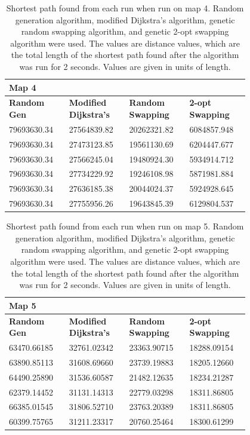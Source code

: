 \documentclass{article}
\begin{document}
\begin{appendices}
\begin{table}[H]
    \caption{Shortest path found from each run when run on map 4. Random generation algorithm, modified Dijkstra's algorithm, genetic random swapping algorithm, and genetic 2-opt swapping algorithm were used. The values are distance values, which are the total length of the shortest path found after the algorithm was run for 2 seconds. Values are given in units of length.} \label{Table map 4}
    \centering
    \begin{tabular}{|p{0.2\linewidth}|p{0.2\linewidth}|p{0.2\linewidth}|p{0.2\linewidth}|}
    \hline
        \textbf{Map 4} & ~ & ~ & ~ \\ \hline
        \textbf{Random Gen} & \textbf{Modified Dijkstra's} & \textbf{Random Swapping} & \textbf{2-opt Swapping} \\ \hline
        79693630.34 & 27564839.82 & 20262321.82 & 6084857.948 \\ \hline
        79693630.34 & 27473123.85 & 19561130.69 & 6204447.677 \\ \hline
        79693630.34 & 27566245.04 & 19480924.30 & 5934914.712 \\ \hline
        79693630.34 & 27734229.92 & 19246108.98 & 5871981.884 \\ \hline
        79693630.34 & 27636185.38 & 20044024.37 & 5924928.645 \\ \hline
        79693630.34 & 27755956.26 & 19643845.39 & 6129804.537 \\ \hline
    \end{tabular}
\end{table}

\begin{table}[H]
    \caption{Shortest path found from each run when run on map 5. Random generation algorithm, modified Dijkstra's algorithm, genetic random swapping algorithm, and genetic 2-opt swapping algorithm were used. The values are distance values, which are the total length of the shortest path found after the algorithm was run for 2 seconds. Values are given in units of length.}
    \centering
    \begin{tabular}{|p{0.2\linewidth}|p{0.2\linewidth}|p{0.2\linewidth}|p{0.2\linewidth}|}
    \hline
        \textbf{Map 5} & ~ & ~ & ~ \\ \hline
        \textbf{Random Gen} & \textbf{Modified Dijkstra's} & \textbf{Random Swapping} & \textbf{2-opt Swapping} \\ \hline
        63470.66185 & 32761.02342 & 23363.90715 & 18288.09154 \\ \hline
        63890.85113 & 31608.69660 & 23739.19883 & 18205.12660 \\ \hline
        64490.25890 & 31536.60587 & 21482.12635 & 18234.21287 \\ \hline
        62379.14452 & 31131.14313 & 22779.03298 & 18311.86805 \\ \hline
        66385.01545 & 31806.52710 & 23763.20389 & 18311.86805 \\ \hline
        60399.75765 & 31211.23317 & 20760.25464 & 18300.61299 \\ \hline
     \end{tabular}
\end{table}


\end{appendices}
\end{document}
